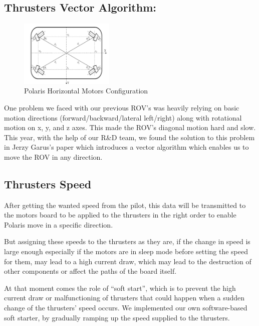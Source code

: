 \documentclass[a4paper,10pt]{article}
\begin{document}
\subsection{Thrusters Vector Algorithm: }	
\begin{figure}
	\centering
	\includegraphics[width = 0.4\textwidth,height= .2\textheight]{vector_algorithm}
	\caption{Polaris Horizontal Motors Configuration}
\end{figure}
One problem we faced with our previous ROV’s was heavily relying on basic motion directions (forward/backward/lateral left/right) along with rotational motion on x, y, and z axes. This made the ROV’s diagonal motion hard and slow. This year, with the help of our R\&D team, we found the solution to this problem in Jerzy Garus’s paper which introduces a vector algorithm which enables us to move the ROV in any direction.
	\subsection{Thrusters Speed}
		After getting the wanted speed from the pilot, this data will be transmitted to the motors board
		to be applied to the thrusters in the right order to enable Polaris move in a specific direction.  
		
		But assigning these speeds to the thrusters as they are, if the change in speed is large enough
		especially if the motors are in sleep mode before setting the speed for them, may lead to a high
		current draw, which may lead to the destruction of other components or affect the paths of the
		board itself.
		
		At that moment comes the role of “soft start”, which is to prevent the high current draw or
		malfunctioning of thrusters that could happen when a sudden change of the thrusters’ speed
		occurs. We implemented our own software-based soft starter, by gradually ramping up the
		speed supplied to the thrusters.
	
\end{document}
